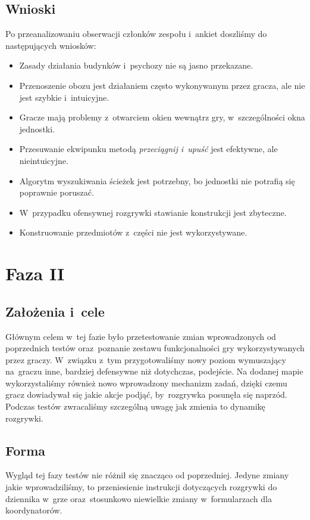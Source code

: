 \documentclass[licencjacka]{pracamgr}
\begin{document}
    \subsection{Wnioski}
      Po przeanalizowaniu obserwacji członków zespołu i~ankiet doszliśmy do następujących wniosków:
      \begin{itemize}
	\item Zasady działania budynków i~psychozy nie są jasno przekazane.
	\item Przenoszenie obozu jest działaniem często wykonywanym przez gracza, ale nie jest szybkie i~intuicyjne.
	\item Gracze mają problemy z~otwarciem okien wewnątrz gry, w~szczególności okna jednostki.
	\item Przesuwanie ekwipunku metodą \emph{przeciągnij i~upuść} jest efektywne, ale nieintuicyjne.
	\item Algorytm wyszukiwania ścieżek jest potrzebny, bo jednostki nie potrafią się poprawnie poruszać.
	\item W~przypadku ofensywnej rozgrywki stawianie konstrukcji jest zbyteczne.
	\item Konstruowanie przedmiotów z~części nie jest wykorzystywane.
      \end{itemize}

  \section{Faza II}

    \subsection{Założenia i~cele}
      Głównym celem w~tej fazie było przetestowanie zmian wprowadzonych od poprzednich testów oraz~poznanie zestawu funkcjonalności gry
      wykorzystywanych przez graczy. W~związku z~tym przygotowaliśmy nowy poziom wymuszający na~graczu inne, bardziej defensywne
      niż dotychczas, podejście. Na dodanej mapie wykorzystaliśmy również nowo wprowadzony mechanizm zadań, dzięki czemu gracz
      dowiadywał się jakie akcje podjąć, by~rozgrywka posunęła się naprzód. Podczas testów zwracaliśmy szczególną uwagę jak zmienia
      to dynamikę rozgrywki.

    \subsection{Forma}
      Wygląd tej fazy testów nie różnił się znacząco od poprzedniej. Jedyne zmiany jakie wprowadziliśmy,
      to przeniesienie instrukcji dotyczących rozgrywki do dziennika w~grze oraz~stosunkowo niewielkie zmiany
      w~formularzach dla koordynatorów.
\end{document}
